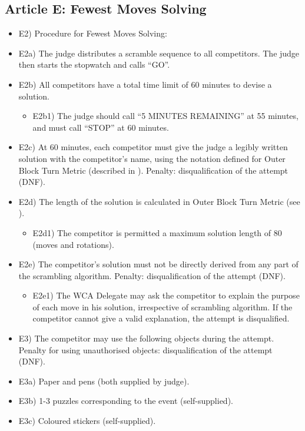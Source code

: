\subsection{ Article E: Fewest Moves Solving}

\begin{itemize}
\item
  E2) Procedure for Fewest Moves Solving:
\item
  E2a) The judge distributes a scramble sequence to all competitors. The
  judge then starts the stopwatch and calls ``GO''.
\item
  E2b) All competitors have a total time limit of 60 minutes to devise a
  solution.

  \begin{itemize}
  \item
    E2b1) The judge should call ``5 MINUTES REMAINING'' at 55 minutes,
    and must call ``STOP'' at 60 minutes.
  \end{itemize}
\item
  E2c) At 60 minutes, each competitor must give the judge a legibly
  written solution with the competitor's name, using the notation
  defined for Outer Block Turn Metric (described in ). Penalty:
  disqualification of the attempt (DNF).
\item
  E2d) The length of the solution is calculated in Outer Block Turn
  Metric (see ).

  \begin{itemize}
  \item
    E2d1) The competitor is permitted a maximum solution length of 80
    (moves and rotations).
  \end{itemize}
\item
  E2e) The competitor's solution must not be directly derived from any
  part of the scrambling algorithm. Penalty: disqualification of the
  attempt (DNF).

  \begin{itemize}
  \item
    E2e1) The WCA Delegate may ask the competitor to explain the purpose
    of each move in his solution, irrespective of scrambling algorithm.
    If the competitor cannot give a valid explanation, the attempt is
    disqualified.
  \end{itemize}
\item
  E3) The competitor may use the following objects during the attempt.
  Penalty for using unauthorised objects: disqualification of the
  attempt (DNF).
\item
  E3a) Paper and pens (both supplied by judge).
\item
  E3b) 1-3 puzzles corresponding to the event (self-supplied).
\item
  E3c) Coloured stickers (self-supplied).
\end{itemize}

